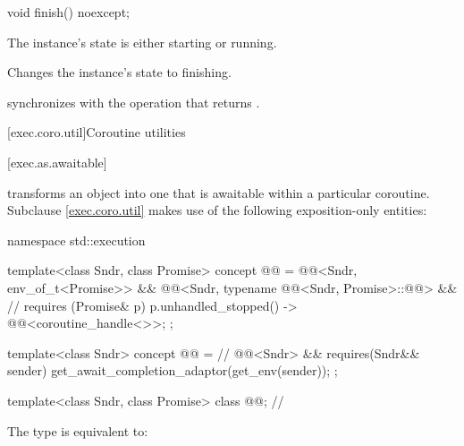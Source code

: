%
\begin{itemdecl}
void finish() noexcept;
\end{itemdecl}

\begin{itemdescr}
\pnum
\expects
The  instance's state is either starting or running.

\pnum
\effects
Changes the  instance's state to finishing.

\pnum
\sync
{} synchronizes with the  operation
that returns .
\end{itemdescr}

[exec.coro.util]{Coroutine utilities}

[exec.as.awaitable]{}

\pnum
{} transforms an object into one
that is awaitable within a particular coroutine.
Subclause \ref{exec.coro.util} makes use of
the following exposition-only entities:
\begin{codeblock}
namespace std::execution {
  template<class Sndr, class Promise>
    concept @@ =
      @@<Sndr, env_of_t<Promise>> &&
      @@<Sndr,
                typename @@<Sndr, Promise>::@@> &&    // \seebelow
      requires (Promise& p) {
        { p.unhandled_stopped() } -> @@<coroutine_handle<>>;
      };

  template<class Sndr>
    concept @@ =            // \expos
      @@<Sndr> &&
      requires(Sndr&& sender) {
        get_await_completion_adaptor(get_env(sender));
      };

  template<class Sndr, class Promise>
    class @@;                                     // \expos
}
\end{codeblock}

\pnum
The type  is equivalent to:

